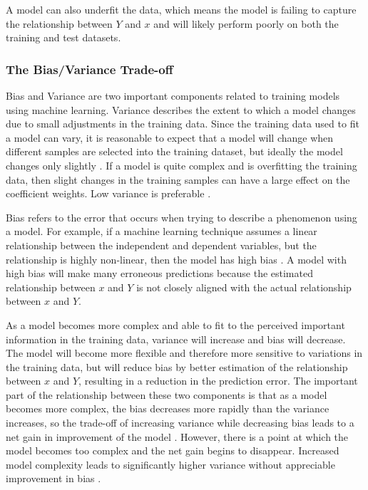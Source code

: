 \documentclass[sigconf]{acmart}
\begin{document}
A model can also underfit the data, which means the model is failing to capture the relationship between \(Y\) and \(x\) and will likely perform poorly on both the training and test datasets.

\subsubsection{The Bias/Variance Trade-off}

Bias and Variance are two important components related to training models using machine learning. Variance describes the extent to which a model changes due to small adjustments in the training data. Since the training data used to fit a model can vary, it is reasonable to expect that a model will change when different samples are selected into the training dataset, but ideally the model changes only slightly \cite{cite03}. If a model is quite complex and is overfitting the training data, then slight changes in the training samples can have a large effect on the coefficient weights. Low variance is preferable \cite{cite03}.

Bias refers to the error that occurs when trying to describe a phenomenon using a model. For example, if a machine learning technique assumes a linear relationship between the independent and dependent variables, but the relationship is highly non-linear, then the model has high bias \cite{cite03}. A model with high bias will make many erroneous predictions because the estimated relationship between \(x\) and \(Y\) is not closely aligned with the actual relationship between \(x\) and \(Y\).

As a model becomes more complex and able to fit to the perceived important information in the training data, variance will increase and bias will decrease. The model will become more flexible and therefore more sensitive to variations in the training data, but will reduce bias by better estimation of the relationship between \(x\) and \(Y\), resulting in a reduction in the prediction error. The important part of the relationship between these two components is that as a model becomes more complex, the bias decreases more rapidly than the variance increases, so the trade-off of increasing variance while decreasing bias leads to a net gain in improvement of the model \cite{cite03}. However, there is a point at which the model becomes too complex and the net gain begins to disappear. Increased model complexity leads to significantly higher variance without appreciable improvement in bias \cite{cite03}. 
\end{document}
